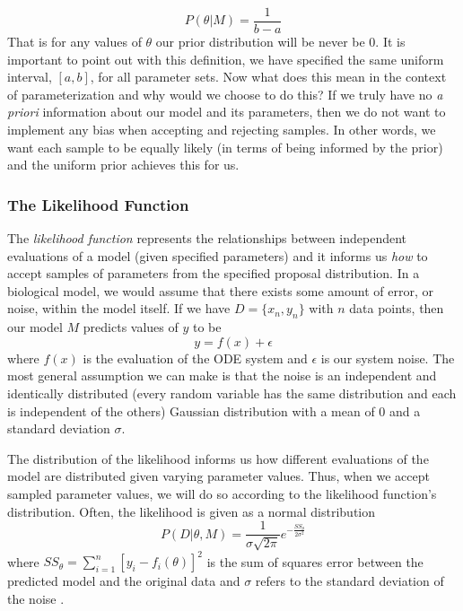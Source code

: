 \documentclass{article}
\begin{document}
\begin{equation} \label{eq:4mcmc}
P(\theta|M) = \frac{1}{b-a}
\end{equation}
That is for any values of $\theta$ our prior distribution will be never be 0. It is important to point out with this definition, we have specified the same uniform interval, $[a, b]$, for all parameter sets. Now what does this mean in the context of parameterization and why would we choose to do this? If we truly have no \emph{a priori} information about our model and its parameters, then we do not want to implement any bias when accepting and rejecting samples. In other words, we want each sample to be equally likely (in terms of being informed by the prior) and the uniform prior achieves this for us. 
\subsubsection{The Likelihood Function} \label{The_Likelihood_Function} The \emph{likelihood function} represents the relationships between independent evaluations of a model (given specified parameters) and it informs us \emph{how} to accept samples of parameters from the specified proposal distribution. In a biological model, we would assume that there exists some amount of error, or noise, within the model itself. If we have $D = \{x_n, y_n\}$ with $n$ data points, then our model $M$ predicts values of $y$ to be
\begin{equation} \label{eq:5mcmc}
y = f(x) + \epsilon
\end{equation}
where $f(x)$ is the evaluation of the ODE system and $\epsilon$ is our system noise. The most general assumption we can make is that the noise is an independent and identically distributed (every random variable has the same distribution and each is independent of the others) Gaussian distribution with a mean of 0 and a standard deviation $\sigma$. 
\par The distribution of the likelihood informs us how different evaluations of the model are distributed given varying parameter values. Thus, when we accept sampled parameter values, we will do so according to the likelihood function's distribution. Often, the likelihood is given as a normal distribution
\begin{equation} \label{eq:6mcmc}
    P(D|\theta, M) = \frac{1}{\sigma \sqrt{2\pi}} e^{-\frac{SS_{\theta}}{{2\sigma^2}}}
\end{equation}
where $SS_{\theta} = \sum_{i=1}^{n}[y_i - f_i(\theta)]^2$ is the sum of squares error between the predicted model and the original data and $\sigma$ refers to the standard deviation of the noise \cite{astrostats}.
\end{document}
